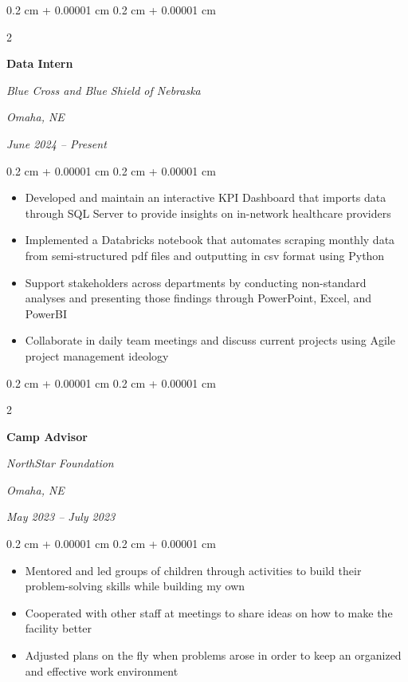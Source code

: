 \documentclass[11pt, letterpaper]{article}
\newenvironment{highlights}{
    \begin{itemize}[
        topsep=0.10 cm,
        parsep=0.10 cm,
        partopsep=0pt,
        itemsep=0pt,
        leftmargin=0.4 cm + 10pt
    ]
}{
    \end{itemize}
} %
\newenvironment{onecolentry}{
    \begin{adjustwidth}{
        0.2 cm + 0.00001 cm
    }{
        0.2 cm + 0.00001 cm
    }
}{
    \end{adjustwidth}
} %
\newenvironment{twocolentry}[2][]{
    \onecolentry
    \def\secondColumn{#2}
    \setcolumnwidth{\fill, 5.0 cm}
    \begin{paracol}{2}
}{
    \switchcolumn \raggedleft \secondColumn
    \end{paracol}
    \endonecolentry
} %
\begin{document}
        
        \begin{twocolentry}{
        \textit{Omaha, NE}    
            
        \textit{June 2024 – Present}}
            \textbf{Data Intern}
            
            \textit{Blue Cross and Blue Shield of Nebraska }
        \end{twocolentry}

        \vspace{0.10 cm}
        \begin{onecolentry}
            \begin{highlights}
                \item Developed and maintain an interactive KPI Dashboard that imports data through SQL Server to provide insights on in-network healthcare providers
                \item Implemented a Databricks notebook that automates scraping monthly data from semi-structured pdf files and outputting in csv format using Python
                \item Support stakeholders across departments by conducting non-standard analyses and presenting those findings through PowerPoint, Excel, and PowerBI
                \item Collaborate in daily team meetings and discuss current projects using Agile project management ideology
            \end{highlights}
        \end{onecolentry}


        \vspace{0.2 cm}

        \begin{twocolentry}{
        \textit{Omaha, NE}    
            
        \textit{May 2023 – July 2023}}
            \textbf{Camp Advisor}
            
            \textit{NorthStar Foundation}
        \end{twocolentry}

        \vspace{0.10 cm}
        \begin{onecolentry}
            \begin{highlights}
                \item Mentored and led groups of children through activities to build their problem-solving skills while building my own
                \item Cooperated with other staff at meetings to share ideas on how to make the facility better
                \item Adjusted plans on the fly when problems arose in order to keep an organized and effective work environment
            \end{highlights}
        \end{onecolentry}
\end{document}
